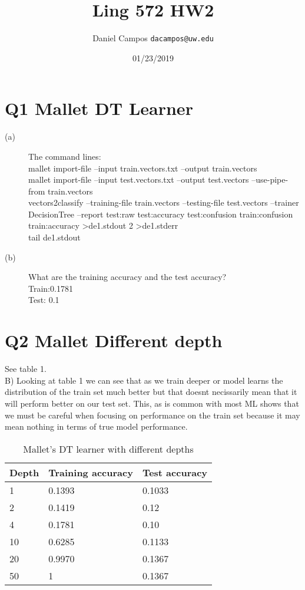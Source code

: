 \documentclass[11pt]{article}
\begin{document}
\title{Ling 572 HW2 }
\author{Daniel Campos  \tt {dacampos@uw.edu}}
\date{01/23/2019}
\maketitle 
\section{  Q1 Mallet DT Learner}
\begin{description}
\item [(a)] The command lines:\\ 
mallet import-file --input train.vectors.txt --output train.vectors\\
mallet import-file --input test.vectors.txt --output test.vectors --use-pipe-from train.vectors \\
vectors2classify --training-file train.vectors --testing-file test.vectors --trainer DecisionTree --report test:raw test:accuracy test:confusion train:confusion train:accuracy \textgreater de1.stdout 2 \textgreater de1.stderr \\
tail de1.stdout 
\item [(b)] What are the training accuracy and the test accuracy? \\
Train:0.1781 \\
Test: 0.1
\end{description}
\section{ Q2 Mallet Different depth}
\begin{table}[h]
\centering
\caption{Mallet's DT learner with different depths}
See table 1. \\ B) Looking at table 1 we can see that as we train deeper or model learns the distribution of the train set much better but that doesnt necissarily mean that it will perform better on our test set. This, as is common with most ML shows that we must be careful when focusing on performance on the train set because it may mean nothing in terms of true model performance.
\label{table1}
\begin{tabular}{|l|l|l|} \hline
Depth   & Training accuracy & Test accuracy \\ \hline
1       & 0.1393 & 0.1033  \\ \hline
2       & 0.1419 & 0.12 \\ \hline
4       &  0.1781 & 0.10 \\ \hline
10      & 0.6285   & 0.1133 \\ \hline
20      &  0.9970 & 0.1367 \\ \hline
50      &  1  & 0.1367 \\ \hline
\end{tabular}
\end{table}
\end{document}
